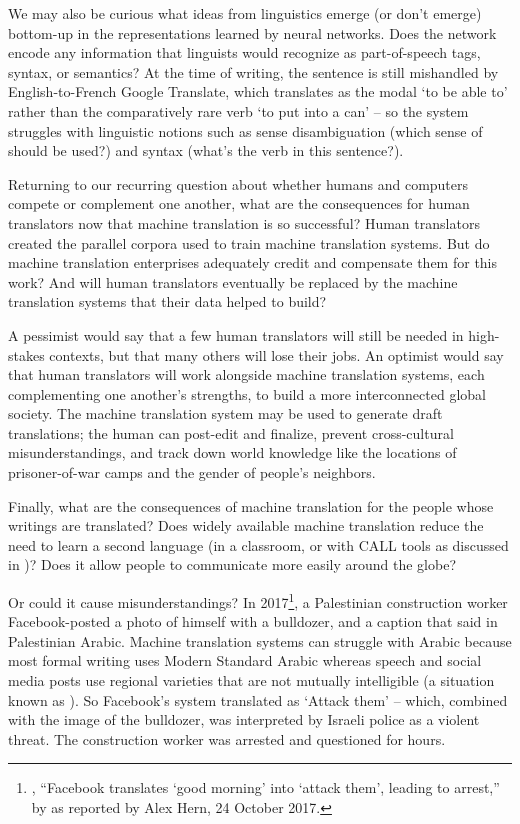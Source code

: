 We may also be curious what ideas from linguistics emerge (or don't emerge) bottom-up in the representations learned by neural networks.  Does the network encode any information that linguists would recognize as part-of-speech tags, syntax, or semantics?  At the time of writing, the sentence  is still mishandled by English-to-French Google Translate, which translates  as the modal  `to be able to' rather than the comparatively rare verb `to put into a can' -- so the system struggles with linguistic notions such as sense disambiguation (which sense of  should be used?) and syntax (what's the verb in this sentence?).

Returning to our recurring question about whether humans and computers compete or complement one another, what are the consequences for human translators now that machine translation is so successful?  Human translators created the parallel corpora used to train machine translation systems.  But do machine translation enterprises adequately credit and compensate them for this work?  And will human translators eventually be replaced by the machine translation systems that their data helped to build?  

A pessimist would say that a few human translators will still be needed in high-stakes contexts, but that many others will lose their jobs.  An optimist would say  that human translators will work alongside machine translation systems, each complementing one another's strengths, to build a more interconnected global society.  The machine translation system may be used to generate draft translations;  the human can post-edit and finalize, prevent cross-cultural misunderstandings, and track down world knowledge like the locations of prisoner-of-war camps and the gender of people's neighbors.  



Finally, what are the consequences of machine translation for the people whose  writings are translated?  Does widely available machine translation reduce the need to learn a second language (in a classroom, or with CALL tools as discussed in )?  Does it allow people to communicate more easily around the globe? 

Or could it cause misunderstandings?  In 2017\footnote{, ``Facebook translates `good morning' into `attack them', leading to arrest,'' by as reported by Alex Hern, 24 October 2017.}, a Palestinian construction worker Facebook-posted a photo of himself with a bulldozer, and a caption that said   in Palestinian Arabic.  Machine translation systems can struggle with  Arabic because most formal writing uses Modern Standard Arabic whereas speech and social media posts use regional varieties that are not mutually intelligible (a situation known as ).  So Facebook's system translated  as `Attack them' -- which, combined with the image of the bulldozer, was interpreted by Israeli police as a violent threat. The construction worker was arrested and questioned for hours.

